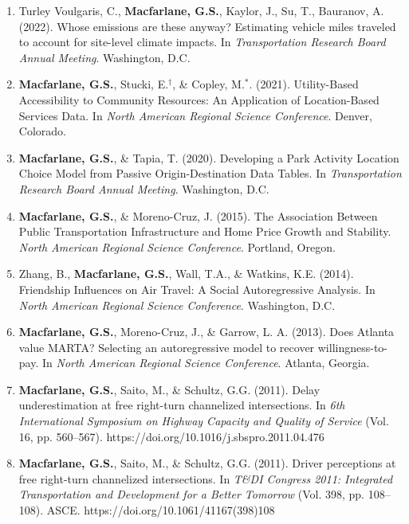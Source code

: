 \documentclass[margin,line]{res}
\newif\ifdetail
\newcounter{enuminitialize}
\newenvironment{myenum}[1][]
{%
 \setcounter{enuminitialize}{#1}
 \addtocounter{enuminitialize}{2}
 \begin{enumerate}[left= 4pt, itemsep=8pt, start=\value{enuminitialize}, label=\arabic*\addtocounter{enumi}{-2}]
}
{%
 \end{enumerate}
}
\begin{document}
\begin{resume}
\begin{myenum}[13]
\item Turley Voulgaris, C., \textbf{Macfarlane, G.S.}, Kaylor, J., Su, T., Bauranov, A. (2022). Whose emissions are these anyway? Estimating vehicle miles traveled to account for site-level climate impacts. In \textit{Transportation Research Board Annual Meeting}. Washington, D.C.
\item \textbf{Macfarlane, G.S.}, Stucki,  E.$^\dagger$,  \& Copley, M.$^*$. (2021). Utility-Based Accessibility to Community Resources: An Application of Location-Based Services Data. In \textit{North American Regional Science Conference}. Denver, Colorado.
\item \textbf{Macfarlane, G.S.}, \& Tapia, T. (2020). Developing a Park Activity Location Choice Model from Passive Origin-Destination Data Tables. In \textit{ Transportation Research Board Annual Meeting}. Washington, D.C.
\item \textbf{Macfarlane, G.S.}, \& Moreno-Cruz, J. (2015). The Association Between Public Transportation Infrastructure and Home Price Growth and Stability. \textit{North American Regional Science Conference}. Portland, Oregon.
\item Zhang, B., \textbf{Macfarlane, G.S.}, Wall, T.A., \& Watkins, K.E. (2014). Friendship Influences on Air Travel: A Social Autoregressive Analysis. In \textit{ North American Regional Science Conference}. Washington, D.C.
\item \textbf{Macfarlane, G.S.}, Moreno-Cruz, J., \& Garrow, L. A. (2013). Does Atlanta value MARTA? Selecting an autoregressive model to recover willingness-to-pay. In \textit{ North American Regional Science Conference}. Atlanta, Georgia.
\item \textbf{Macfarlane, G.S.}, Saito, M., \& Schultz, G.G. (2011). Delay underestimation at free right-turn channelized intersections. In \textit{ 6th
International Symposium on Highway Capacity and Quality of Service} (Vol. 16,
pp. 560–567). https://doi.org/10.1016/j.sbspro.2011.04.476 \ifdetail Citations:
6  \fi

\item \textbf{Macfarlane, G.S.}, Saito, M., \& Schultz, G.G. (2011). Driver
perceptions at free right-turn channelized intersections. In \textit{ T\&DI
Congress 2011: Integrated Transportation and Development for a Better Tomorrow} 
(Vol. 398, pp. 108–108). ASCE. https://doi.org/10.1061/41167(398)108 \ifdetail
Citations: 5  \fi
\end{myenum}


\noindent\makebox[\linewidth]{\rule{\linewidth}{0.4pt}}

\end{resume}
\end{document}
